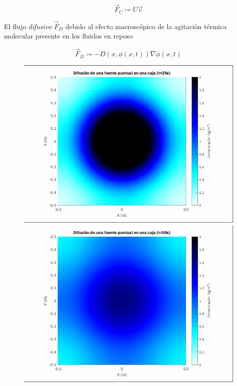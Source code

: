 \begin{equation}
	\vec{F}_{C}\coloneqq
	U\vec{v}
\end{equation}

El flujo \emph{difusivo} $\vec{F}_{D}$ debido al efecto macroscópico de la
agitación térmica molecular presente en los fluidos en reposo

\begin{equation}
	\vec{F}_{D}\coloneqq
	-D\left(x,\phi\left(x,t\right)\right)
	\nabla\phi\left(x,t\right)
\end{equation}

\begin{figure}[ht!]
	\centering
	\includegraphics[width=.3\paperwidth]{E_IMAGENES/1_Capitulo2/25.png}\qquad
	\includegraphics[width=.3\paperwidth]{E_IMAGENES/1_Capitulo2/50.png}

\end{figure}

